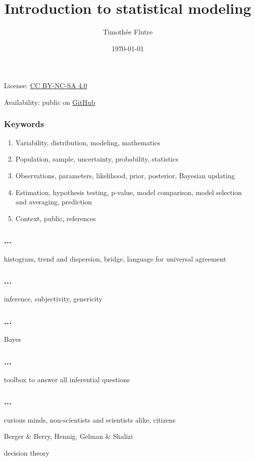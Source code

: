 \documentclass[c]{beamer} %
\title[Intro statistical modeling]{Introduction to statistical modeling}
\author[T. Flutre]{Timoth\'{e}e Flutre}
\institute[INRA]{Institut National de la Recherche Agronomique, France}
\date{\today}
\begin{document}
\begin{frame}
  \titlepage
  
  \small
  \begin{center}
    License: \href{http://creativecommons.org/licenses/by-nc-sa/4.0/}{CC BY-NC-SA 4.0}
    
    Availability: public on \href{http://www.github.com/ncs}{GitHub}
  \end{center}
\end{frame}                                                                                                                       

\begin{frame}
  \frametitle{Keywords}
  \begin{enumerate}
  \item Variability, distribution, modeling, mathematics
    \bigskip
  \item Population, sample, uncertainty, probability, statistics
    \bigskip
  \item Observations, parameters, likelihood, prior, posterior, Bayesian updating
    \bigskip
  \item Estimation, hypothesis testing, p-value, model comparison, model selection and averaging, prediction
    \bigskip
  \item Context, public, references
  \end{enumerate}
\end{frame}

\begin{frame}
  \frametitle{...}
  histogram, trend and dispersion, bridge, language for universal agreement
\end{frame}

\begin{frame}
  \frametitle{...}
  inference, subjectivity, genericity
\end{frame}

\begin{frame}
  \frametitle{...}
  Bayes
\end{frame}

\begin{frame}
  \frametitle{...}
  toolbox to answer all inferential questions
\end{frame}

\begin{frame}
  \frametitle{...}
  curious minds, non-scientists and scientists alike, citizens
  
  Berger \& Berry, Hennig, Gelman \& Shalizi
  
  decision theory
\end{frame}
\end{document}
